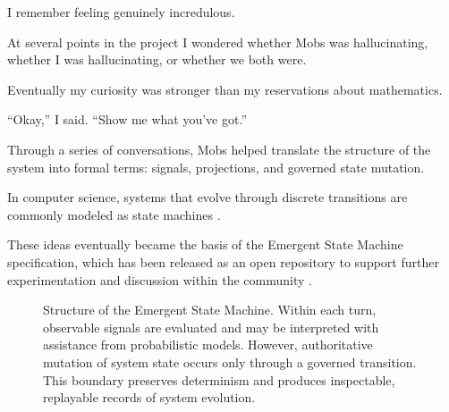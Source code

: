 \documentclass[11pt]{article}
\begin{document}
I remember feeling genuinely incredulous.

At several points in the project I wondered whether Mobs was hallucinating, whether I was hallucinating, or whether we both were.

Eventually my curiosity was stronger than my reservations about mathematics.

“Okay,” I said. “Show me what you’ve got.”

Through a series of conversations, Mobs helped translate the structure of the system into formal terms: signals, projections, and governed state mutation.

In computer science, systems that evolve through discrete transitions are commonly modeled as state machines \citep{hopcroft2006}.

These ideas eventually became the basis of the Emergent State Machine specification, which has been released as an open repository to support further experimentation and discussion within the community \citep{hines2026}.

\begin{figure}[H]
\centering


\caption{Structure of the Emergent State Machine. Within each turn, observable signals are evaluated and may be interpreted with assistance from probabilistic models. However, authoritative mutation of system state occurs only through a governed transition. This boundary preserves determinism and produces inspectable, replayable records of system evolution.}
\end{figure}
\end{document}
